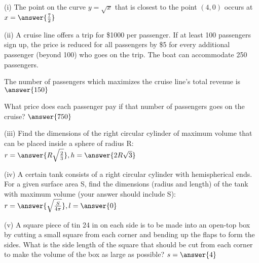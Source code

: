\documentclass{ximera}
\begin{document}
\begin{exercise}
(i) The point on the curve $y=\sqrt{x}$ that is closest to the point $(4,0)$ occurs at $x=\answer{\frac{7}{2}}$

(ii) A cruise line offers a trip for \$1000 per passenger. If at least 100 passengers sign up, the price is reduced for all passengers by \$5 for every additional passenger (beyond 100) who goes on the trip.  The boat can accommodate 250 passengers.

The number of passengers which maximizes the cruise line's total revenue is $\answer{150}$

What price does each passenger pay if that number of passengers goes on the cruise? $\answer{750}$

(iii) Find the dimensions of the right circular cylinder of maximum volume that can be placed inside a sphere of radius R: $r=\answer{R\sqrt{\frac{2}{3}}},  h=\answer{2R\sqrt{3}}$

(iv) A certain tank consists of a right circular cylinder with hemispherical ends. For a given surface area S, find the dimensions (radius and length) of the tank with maximum volume (your answer should include S): $r=\answer{\sqrt{\frac{S}{4\pi}}}, l=\answer{0}$

(v) A square piece of tin 24 in on each side is to be made into an open-top box by cutting a small square from each corner and bending up the flaps to form the sides.  What is the side length of the square that should be cut from each corner to make the volume of the box as large as possible? $s=\answer{4}$
\end{exercise}
\end{document}
